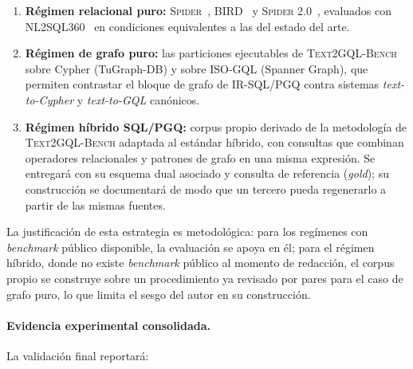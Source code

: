 \begin{enumerate}
    \item \textbf{Régimen relacional puro:} \textsc{Spider}~\cite{Spider2018}, \textsc{BIRD}~\cite{BIRD2023} y \textsc{Spider 2.0}~\cite{spider2_2025}, evaluados con \textsc{NL2SQL360}~\cite{SuperSQL2024} en condiciones equivalentes a las del estado del arte.
    \item \textbf{Régimen de grafo puro:} las particiones ejecutables de \textsc{Text2GQL-Bench}~\cite{text2gqlbench} sobre Cypher (TuGraph-DB) y sobre ISO-GQL (Spanner Graph), que permiten contrastar el bloque de grafo de IR-SQL/PGQ contra sistemas \emph{text-to-Cypher} y \emph{text-to-GQL} canónicos.
    \item \textbf{Régimen híbrido \ac{SQL}/\ac{PGQ}:} corpus propio derivado de la metodología de \textsc{Text2GQL-Bench} adaptada al estándar híbrido, con consultas que combinan operadores relacionales y patrones de grafo en una misma expresión. Se entregará con su esquema dual asociado y consulta de referencia (\emph{gold}); su construcción se documentará de modo que un tercero pueda regenerarlo a partir de las mismas fuentes.
\end{enumerate}

La justificación de esta estrategia es metodológica: para los regímenes con \emph{benchmark} público disponible, la evaluación se apoya en él; para el régimen híbrido, donde no existe \emph{benchmark} público al momento de redacción, el corpus propio se construye sobre un procedimiento ya revisado por pares para el caso de grafo puro, lo que limita el sesgo del autor en su construcción.

\paragraph{Evidencia experimental consolidada.} La validación final reportará:

